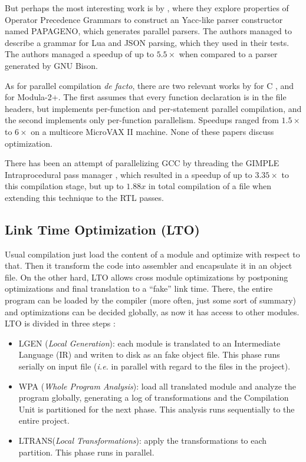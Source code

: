 \documentclass[runningheads]{llncs}
\begin{document}
But perhaps the most interesting work is by
\cite{Barenghi:2015:PPM:2839536.2840146}, where they explore properties of
Operator Precedence Grammars to construct an Yacc-like parser constructor named
PAPAGENO, which generates parallel parsers. The authors managed to describe a
grammar for Lua and JSON parsing, which they used in their tests. The authors
managed a speedup of up to $5.5\times$ when compared to a parser generated by
GNU Bison.

As for parallel compilation \textit{de facto}, there are two relevant works by
\cite{vandevoorde1988parallel} for C , and \cite{wortman1992} for Modula-2+.
The first assumes that every function declaration is in the file headers, but
implements per-function and per-statement parallel compilation, and the second
implements only per-function parallelism.  Speedups ranged from $1.5\times$ to
$6\times$ on a multicore MicroVAX II machine. None of these papers discuss
optimization.

There has been an attempt of parallelizing GCC by threading the GIMPLE
Intraprocedural pass manager \cite{bernardino2020improving}, which resulted in
a speedup of up to $3.35\times$ to this compilation stage, but up to $1.88x$ in
total compilation of a file when extending this technique to the RTL passes.


\subsection{Link Time Optimization (LTO)}

Usual compilation just load the content of a module and optimize with respect to
that. Then it transform the code into assembler and encapsulate it in an object
file. On the other hard, LTO allows cross module optimizations by
postponing optimizations and final translation to a ``fake'' link time.
There, the entire program can be loaded by the compiler
(more often, just some sort of summary) and optimizations can be decided globally,
as now it has access to other modules. LTO is divided in three steps
\cite{whoprgoogle,glek2010optimizing}:
\begin{itemize}
\item LGEN (\textit{Local Generation}): each module is translated to an Intermediate
Language (IR) and writen to disk as an fake object file. This phase runs serially
on input file (\textit{i.e.} in parallel with regard to the files in the project).

\item WPA (\textit{Whole Program Analysis}): load all translated module and analyze
the program globally, generating a log of transformations and the Compilation Unit
is partitioned for the next phase. This analysis runs sequentially to the entire
project.

\item LTRANS(\textit{Local Transformations}): apply the transformations to each partition.
This phase runs in parallel.
\end{itemize}
\end{document}
